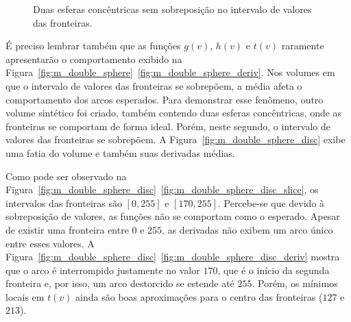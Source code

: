 \begin{figure}[h]
{		\label{fig:m_double_sphere_tf_right}
	}
	\caption{Duas esferas concêntricas sem sobreposição no intervalo de valores das fronteiras.}
	\label{fig:m_double_sphere_tf}
\end{figure}

	É preciso lembrar também que as funções $ g(v) $, $ h(v) $ e $ t(v) $ raramente apresentarão o comportamento exibido na Figura~\ref{fig:m_double_sphere}~\ref{fig:m_double_sphere_deriv}. Nos volumes em que o intervalo de valores das fronteiras se sobrepõem, a média afeta o comportamento dos arcos esperados. Para demonstrar esse fenômeno, outro volume sintético foi criado, também contendo duas esferas concêntricas, onde as fronteiras se comportam de forma ideal. Porém, neste segundo, o intervalo de valores das fronteiras se sobrepõem. A Figura~\ref{fig:m_double_sphere_disc} exibe uma fatia do volume e também suas derivadas médias.
	
	Como pode ser observado na Figura~\ref{fig:m_double_sphere_disc}~\ref{fig:m_double_sphere_disc_slice}, os intervalos das fronteiras são $ [0,255] $ e $ [170,255] $. Percebe-se que devido à sobreposição de valores, as funções não se comportam como o esperado. Apesar de existir uma fronteira entre $ 0 $ e $ 255 $, as derivadas não exibem um arco único entre esses valores. A Figura~\ref{fig:m_double_sphere_disc}~\ref{fig:m_double_sphere_disc_deriv} mostra que o arco é interrompido justamente no valor $ 170 $, que é o início da segunda fronteira e, por isso, um arco destorcido se estende até $ 255 $.	Porém, os mínimos locais em $ t(v) $ ainda são boas aproximações para o centro das fronteiras ($ 127 $ e $ 213 $).
	
